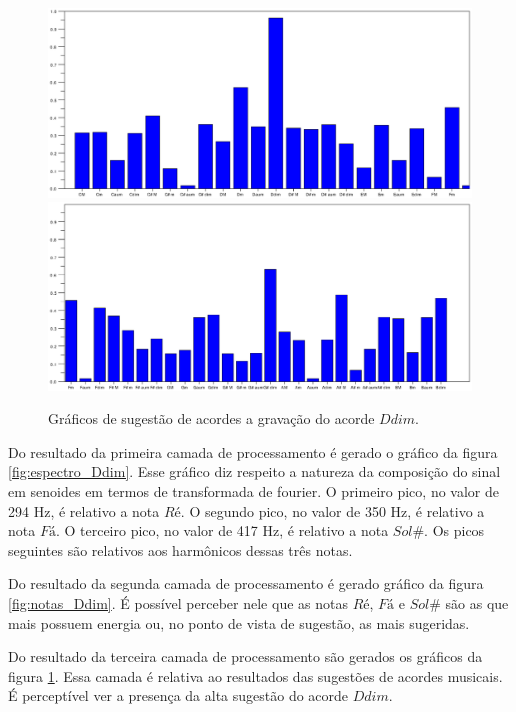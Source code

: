 \begin{figure}[h]
	\centering
		\includegraphics[keepaspectratio=true,scale=0.49]{figuras/Dm/acordes_1_Ddim.eps}
		\includegraphics[keepaspectratio=true,scale=0.49]{figuras/Dm/acordes_2_Ddim.eps}
	\caption{Gráficos de sugestão de acordes a gravação do acorde $Ddim$.}
  \label{fig:acordes_Ddim}
\end{figure}


Do resultado da primeira camada de processamento é gerado o gráfico da figura \ref{fig:espectro_Ddim}. Esse gráfico diz respeito a natureza da composição do sinal em senoides em termos de transformada de fourier. O primeiro pico, no valor de 294 Hz, é relativo a nota $Ré$. O segundo pico, no valor de 350 Hz, é relativo a nota $Fá$. O terceiro pico, no valor de 417 Hz, é relativo a nota $Sol\#$. Os picos seguintes são relativos aos harmônicos dessas três notas.

Do resultado da segunda camada de processamento é gerado gráfico da figura \ref{fig:notas_Ddim}. É possível perceber nele que as notas $Ré$, $Fá$ e $Sol\#$ são as que mais possuem energia ou, no ponto de vista de sugestão, as mais sugeridas.

Do resultado da terceira camada de processamento são gerados os gráficos da figura \ref{fig:acordes_Ddim}. Essa camada é relativa ao resultados das sugestões de acordes musicais. É perceptível ver a presença da alta sugestão do acorde $Ddim$.

